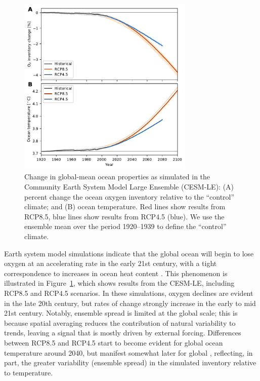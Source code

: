 \documentclass[draft,linenumbers]{report_chapter}
\begin{document}
\begin{figure}[tbp]
\centering
\includegraphics[width=0.75\textwidth]{cesm-global-timeseries.pdf}
\caption{Change in global-mean ocean properties as simulated in the Community Earth System Model Large Ensemble (CESM-LE): (A) percent change the ocean oxygen inventory relative to the ``control'' climate; and (B) ocean temperature.
Red lines show results from RCP8.5, blue lines show results from RCP4.5 (blue).
We use the ensemble mean over the period 1920--1939 to define the ``control'' climate.}
\label{fig:cesm-global-timeseries}
\end{figure}

Earth system model simulations indicate that the global ocean will begin to lose oxygen at an accelerating rate in the early 21st century, with a tight correspondence to increases in ocean heat content \citep{Bopp-Resplandy-etal-2013}.
This phenomenon is illustrated in Figure~\ref{fig:cesm-global-timeseries}, which shows results from the CESM-LE, including RCP8.5 and RCP4.5 scenarios.
In these simulations, oxygen declines are evident in the late 20th century, but rates of change strongly increase in the early to mid 21st century.
Notably, ensemble spread is limited at the global scale; this is because spatial averaging reduces the contribution of natural variability to trends, leaving a signal that is mostly driven by external forcing.
Differences between RCP8.5 and RCP4.5 start to become evident for global ocean temperature around 2040, but manifest somewhat later for global , reflecting, in part, the greater variability (ensemble spread) in the simulated  inventory relative to temperature.
\end{document}
